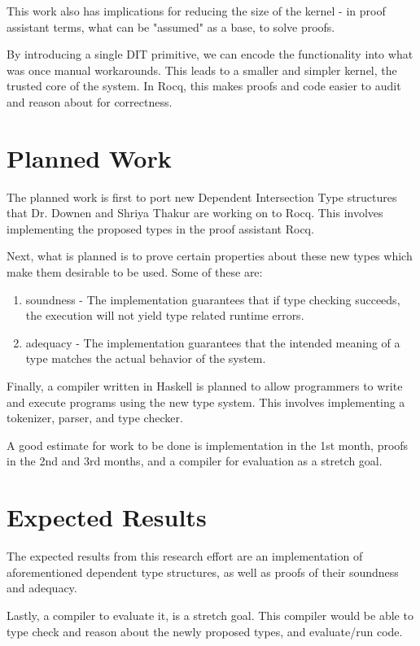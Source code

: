 \documentclass[11pt]{article}
\begin{document}
This work also has implications for reducing the size of the kernel - in proof assistant
terms, what can be "assumed" as a base, to solve proofs.

By introducing a single DIT primitive, we can encode
the functionality into what was once manual workarounds.
This leads to a smaller and simpler kernel, the trusted core of 
the system. In Rocq, this makes proofs and code easier to audit and reason 
about for correctness.


\section*{Planned Work}
The planned work is first to port new Dependent Intersection Type structures that Dr. Downen and Shriya Thakur are working on
to Rocq. This involves implementing the proposed types in the proof assistant Rocq.

Next, what is planned is to prove certain properties about these new types which make them desirable to be used.
Some of these are: 

\begin{enumerate}
  \item soundness - The implementation guarantees that if type checking succeeds, the execution will 
    not yield type related runtime errors.
  \item adequacy - The implementation guarantees that the intended meaning of a type matches the actual
    behavior of the system.
\end{enumerate}

Finally, a compiler written in Haskell is planned to allow programmers to write and execute
programs using the new type system.
This involves implementing a tokenizer, parser, and type checker.

A good estimate for work to be done is implementation in the 1st month, proofs in the 2nd and 3rd months,
and a compiler for evaluation as a stretch goal.

\section*{Expected Results}

The expected results from this research effort are an implementation of aforementioned dependent type structures,
as well as proofs of their soundness and adequacy.

Lastly, a compiler to evaluate it, is a stretch goal. This compiler would be able to type check and reason about
the newly proposed types, and evaluate/run code.
\end{document}

